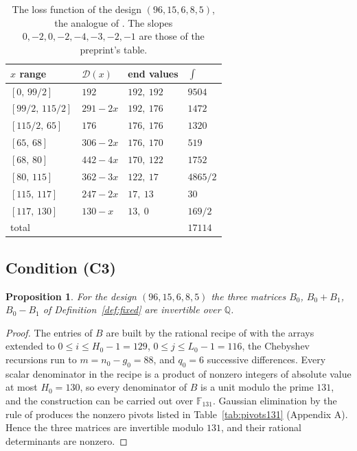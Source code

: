 \documentclass[11pt]{article}
\newtheorem{proposition}[theorem]{Proposition}
\theoremstyle{definition}
\newcommand{\Dl}{\mathcal{D}}
\begin{document}
\begin{table}[ht]
\centering
\begin{tabular}{llll}
\toprule
$x$ range & $\Dl(x)$ & end values & $\int$ \\
\midrule
$[0,\,99/2]$ & $192$ & $192,\ 192$ & $9504$\\
$[99/2,\,115/2]$ & $291-2x$ & $192,\ 176$ & $1472$\\
$[115/2,\,65]$ & $176$ & $176,\ 176$ & $1320$\\
$[65,\,68]$ & $306-2x$ & $176,\ 170$ & $519$\\
$[68,\,80]$ & $442-4x$ & $170,\ 122$ & $1752$\\
$[80,\,115]$ & $362-3x$ & $122,\ 17$ & $4865/2$\\
$[115,\,117]$ & $247-2x$ & $17,\ 13$ & $30$\\
$[117,\,130]$ & $130-x$ & $13,\ 0$ & $169/2$\\
\midrule
total & & & $17114$\\
\bottomrule
\end{tabular}
\caption{The loss function of the design $(96,15,6,8,5)$, the analogue of \cite[Table~(43)]{OAI}. The slopes $0,-2,0,-2,-4,-3,-2,-1$ are those of the preprint's table.}\label{tab:loss}
\end{table}

\subsection{Condition (C3)}

\begin{proposition}\label{prop:c3}
For the design $(96,15,6,8,5)$ the three matrices $B_0$, $B_0+B_1$, $B_0-B_1$ of Definition~\ref{def:fixed} are invertible over $\mathbb Q$.
\end{proposition}

\begin{proof}
The entries of $B$ are built by the rational recipe of \cite[Sec.~4.4]{OAI} with the arrays extended to $0\le i\le H_0-1=129$, $0\le j\le L_0-1=116$, the Chebyshev recursions run to $m=n_0-g_0=88$, and $q_0=6$ successive differences. Every scalar denominator in the recipe is a product of nonzero integers of absolute value at most $H_0=130$, so every denominator of $B$ is a unit modulo the prime $131$, and the construction can be carried out over $\mathbb F_{131}$. Gaussian elimination by the rule of \cite[Sec.~4.4]{OAI} produces the nonzero pivots listed in Table~\ref{tab:pivots131} (Appendix A). Hence the three matrices are invertible modulo $131$, and their rational determinants are nonzero.
\end{proof}
\end{document}
